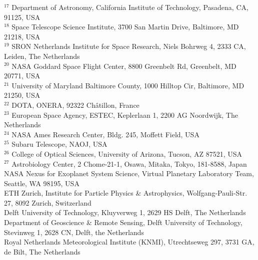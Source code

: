\documentclass[
    usenatbib,
]{mnras}
\makeatletter
\newcommand{\affiliationtarget}[1]{\Hy@raisedlink{\hypertarget{#1}{}}}
\makeatother
\begin{document}
$^{17}$ Department of Astronomy, California Institute of Technology, Pasadena, CA, 91125, USA \\
$^{18}$ Space Telescope Science Institute, 3700 San Martin Drive, Baltimore, MD 21218, USA \\
$^{19}$ SRON Netherlands Institute for Space Research, Niels Bohrweg 4, 2333 CA, Leiden, The Netherlands \\
$^{20}$ NASA Goddard Space Flight Center, 8800 Greenbelt Rd, Greenbelt, MD  20771, USA \\
$^{21}$ University of Maryland Baltimore County, 1000 Hilltop Cir, Baltimore, MD 21250, USA \\
$^{22}$ DOTA, ONERA, 92322 Châtillon, France \\
$^{23}$ European Space Agency, ESTEC, Keplerlaan 1, 2200 AG Noordwijk, The Netherlands \\
$^{24}$ NASA Ames Research Center, Bldg. 245, Moffett Field, USA \\
$^{25}$ Subaru Telescope, NAOJ, USA \\
$^{26}$ College of Optical Sciences, University of Arizona, Tucson, AZ 87521, USA \\
$^{27}$ Astrobiology Center, 2 Chome-21-1, Osawa, Mitaka, Tokyo, 181-8588, Japan \\
\affiliationtarget{28}{$^{28}$} NASA Nexus for Exoplanet System Science, Virtual Planetary Laboratory Team, Seattle, WA 98195, USA \\
\affiliationtarget{29}{$^{29}$} ETH Zurich, Institute for Particle Physics \& Astrophysics, Wolfgang-Pauli-Str. 27, 8092 Zurich, Switzerland \\
\affiliationtarget{30}{$^{30}$} Delft University of Technology, Kluyverweg 1, 2629 HS Delft, The Netherlands \\
\affiliationtarget{32}{$^{31}$} Department of Geoscience \& Remote Sensing, Delft University of Technology, Stevinweg 1, 2628 CN, Delft, the Netherlands \\
\affiliationtarget{31}{$^{32}$} Royal Netherlands Meteorological Institute (KNMI), Utrechtseweg 297, 3731 GA, de Bilt, The Netherlands \\
\endgroup
\end{document}
